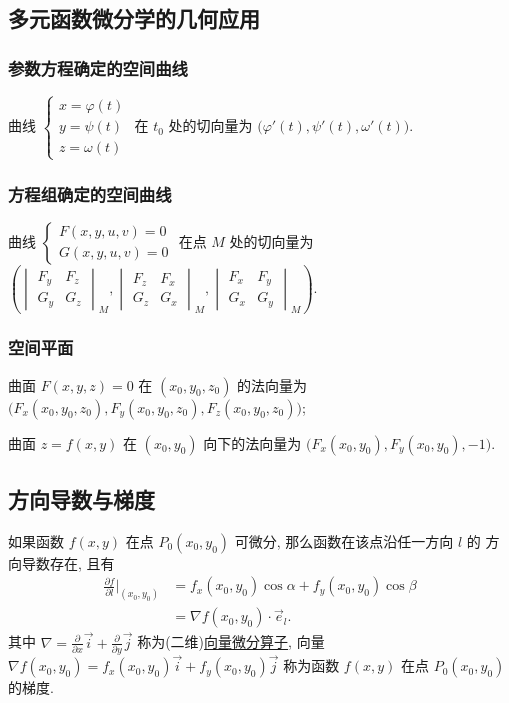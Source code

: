 \documentclass[a4paper,10pt,fleqn]{article}
\newcommand{\pdif}[2]{\frac{\partial #1}{\partial #2}}
\begin{document}
\subsection{多元函数微分学的几何应用}

\subsubsection*{参数方程确定的空间曲线}

曲线 $\begin{cases}x=\varphi(t)\\y=\psi(t)\\z=\omega(t)\end{cases}$ 在 $t_0$ 处的切向量为
$\big(\varphi'(t),\psi'(t),\omega'(t)\big)$.

\subsubsection*{方程组确定的空间曲线}

曲线 $\begin{cases}F(x,y,u,v)=0\\G(x,y,u,v)=0\end{cases}$ 在点 $M$ 处的切向量为
$\left(\begin{vmatrix}F_y&F_z\\G_y&G_z\end{vmatrix}_M,\begin{vmatrix}F_z&F_x\\G_z&G_x\end{vmatrix}_M,\begin{vmatrix}F_x&F_y\\G_x&G_y\end{vmatrix}_M\right)$.

\subsubsection*{空间平面}

曲面 $F(x,y,z)=0$ 在 $(x_0,y_0,z_0)$ 的法向量为
$\big(F_x(x_0,y_0,z_0),F_y(x_0,y_0,z_0),F_z(x_0,y_0,z_0)\big)$;

曲面 $z=f(x,y)$ 在 $(x_0,y_0)$ 向下的法向量为
$\big(F_x(x_0,y_0),F_y(x_0,y_0),-1\big)$.

\subsection{方向导数与梯度}

\begin{thm}
    如果函数 $f(x,y)$ 在点 $P_0(x_0,y_0)$ 可微分, 那么函数在该点沿任一方向 $l$ 的 方向导数存在, 且有
    \begin{align*}
        \pdif{f}{l}\bigg|_{(x_0,y_0)} & =f_x(x_0,y_0)\cos\alpha+f_y(x_0,y_0)\cos\beta \\
                                      & =\nabla f(x_0,y_0)\cdot\vec{e}_l.
    \end{align*}
    其中 $\nabla=\pdif{}{x}\vec{i}+\pdif{}{y}\vec{j}$ 称为(二维)\uline{向量微分算子}, 向量 $\nabla f(x_0,y_0)=f_x(x_0,y_0)\vec{i}+f_y(x_0,y_0)\vec{j}$
    称为函数 $f(x,y)$ 在点 $P_0(x_0,y_0)$ 的梯度.
\end{thm}
\end{document}
